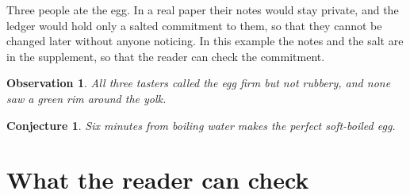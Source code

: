 \documentclass[11pt]{article}
\newtheorem{observation}[theorem]{Observation}
\newtheorem{conjecture}[theorem]{Conjecture}
\begin{document}
Three people ate the egg. In a real paper their notes would stay private, and the ledger would hold only a
salted commitment to them, so that they cannot be changed later without anyone noticing. In this example
the notes and the salt are in the supplement, so that the reader can check the commitment.

\begin{observation}\label{obs:taste}
  All three tasters called the egg firm but not rubbery, and none saw a green rim around the yolk.
\end{observation}

\begin{conjecture}\label{conj:six}
  Six minutes from boiling water makes the perfect soft-boiled egg.
\end{conjecture}

\section{What the reader can check}




\end{document}
